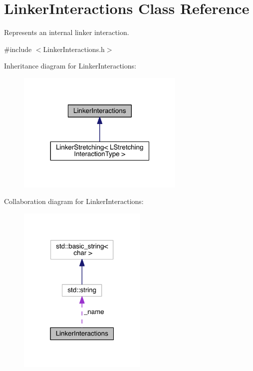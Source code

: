 \hypertarget{classLinkerInteractions}{\section{Linker\+Interactions Class Reference}
\label{classLinkerInteractions}
}


Represents an internal linker interaction.  




{\ttfamily \#include $<$Linker\+Interactions.\+h$>$}



Inheritance diagram for Linker\+Interactions\+:\nopagebreak
\begin{figure}[H]
\begin{center}
\leavevmode
\includegraphics[width=227pt]{classLinkerInteractions__inherit__graph}
\end{center}
\end{figure}


Collaboration diagram for Linker\+Interactions\+:\nopagebreak
\begin{figure}[H]
\begin{center}
\leavevmode
\includegraphics[width=175pt]{classLinkerInteractions__coll__graph}
\end{center}
\end{figure}
